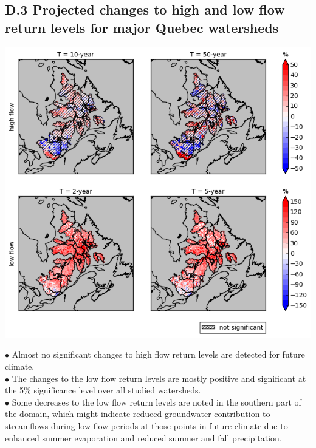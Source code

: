 \documentclass[a0,landscape]{a0poster}
\newcommand{\vspacebetweenbullets}{0.25cm}
\begin{document}
\begin{multicols*}{4}
\subsection*{D.3 Projected changes to high and low flow return levels for major Quebec watersheds \citep{huziy2016impact}}
\begin{center}
  \includegraphics[width=0.6\linewidth]{extreme_low_and_high_flow_RL}
\end{center}
$\bullet$ Almost no significant changes to high flow return levels are detected for future climate. \\[\vspacebetweenbullets]
$\bullet$ The changes to the low flow return levels are mostly positive and significant at the 5\% significance level over all studied watersheds. \\[\vspacebetweenbullets]
$\bullet$ Some decreases to the low flow return levels are noted in the southern part of
      the domain, which might indicate reduced groundwater contribution to streamflows
      during low flow periods at those points in future climate due to enhanced summer
      evaporation and reduced summer and fall precipitation.


\end{multicols*}
\end{document}
